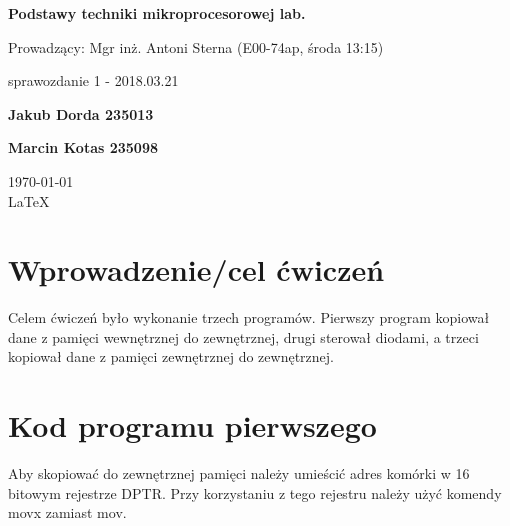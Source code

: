 \documentclass[12pt,a4paper]{article}
\begin{document}
	
	\begin{titlepage}
		
		\centering
		{\huge\bfseries Podstawy techniki mikroprocesorowej lab.\par}
		
		\vspace{0.5cm}
		Prowadzący: Mgr inż. Antoni Sterna (E00-74ap, środa 13:15) \\
	
		\vspace{1.1cm}
		{\Large sprawozdanie 1 - 2018.03.21\par}
		\vfill
		
		{\large\bfseries Jakub Dorda 235013\par}
		{\large\bfseries Marcin Kotas 235098\par}
		
		\vspace{1cm}
		\today \\ \LaTeX
		
		\restoregeometry
	\end{titlepage}


	\section{Wprowadzenie/cel ćwiczeń}
		Celem ćwiczeń było wykonanie trzech programów. Pierwszy program kopiował dane z pamięci wewnętrznej do zewnętrznej, drugi sterował diodami, a trzeci kopiował dane z pamięci zewnętrznej do zewnętrznej.
		
	\section{Kod programu pierwszego}
		\begin{minipage}{.5\textwidth}
			
		\end{minipage}%
		\begin{minipage}{.5\textwidth}
			Aby skopiować do zewnętrznej pamięci należy umieścić adres komórki w 16 bitowym rejestrze DPTR.
			Przy korzystaniu z tego rejestru należy użyć komendy movx zamiast mov.
		\end{minipage}
	
\end{document}
